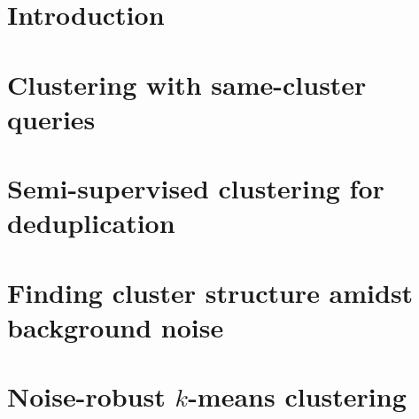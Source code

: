 \documentclass[letterpaper,12pt,titlepage,oneside,final]{book}
\let\origdoublepage\cleardoublepage
\newcommand{\clearemptydoublepage}{%
  \clearpage{\pagestyle{empty}\origdoublepage}}
\let\cleardoublepage\clearemptydoublepage
\begin{document}
 

\chapter{Introduction}
\label{chapter:introduction}


\chapter{Clustering with same-cluster queries}
\label{chapter:activeClustering}

\begin{subappendices}

\end{subappendices}

\chapter{Semi-supervised clustering for deduplication}
\label{chapter:deduplication}


\begin{subappendices}

\end{subappendices}

\chapter{Finding cluster structure amidst background noise}
\label{chapter:clusteringNoise}


\chapter{Noise-robust $k$-means clustering}
\label{chapter:optimizationClustering}

\begin{subappendices}

\end{subappendices}


\cleardoublepage 
{}  

\renewcommand*{\bibname}{References}




%
\end{document}
